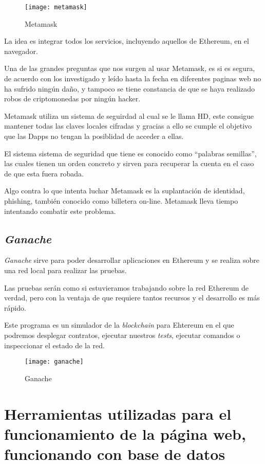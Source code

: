 \begin{figure}[h]
	\centering
  \texttt{[image: metamask]}
  \caption{Metamask}
\end{figure}

La idea es integrar todos los servicios, incluyendo aquellos de Ethereum, en el navegador.

Una de las grandes preguntas que nos surgen al usar Metamask, es si es segura, de acuerdo con los investigado y leído hasta la fecha en diferentes paginas web no ha sufrido ningún daño, y tampoco se tiene constancia de que se haya realizado robos de criptomonedas por ningún hacker.

Metamask utiliza un sistema de seguirdad al cual se le llama HD, este consigue mantener todas las claves locales cifradas y gracias a ello se cumple el objetivo que las Dapps no tengan la posiblidad de acceder a ellas.

El sistema sistema de seguridad que tiene es conocido como ``palabras semillas'', las cuales tienen un orden concreto y sirven para recuperar la cuenta en el caso de que esta fuera robada.
 
Algo contra lo que intenta luchar Metamask es la suplantación de identidad, phishing, también conocido como billetera on-line. Metamask lleva tiempo intentando combatir este problema. 
 
\subsection{\textit{Ganache}}

\textit{Ganache}\cite{ganache} sirve para poder desarrollar aplicaciones en Ethereum y se realiza sobre una red local para realizar las pruebas. 

Las pruebas serán como si estuvieramos trabajando sobre la red Ethereum de verdad, pero con la ventaja de que requiere tantos recursos y el desarrollo es más rápido. 

Este programa es un simulador de la \textit{blockchain} para Ehtereum en el que podremos desplegar contratos, ejecutar nuestros \textit{tests}, ejecutar comandos o inspeccionar el estado de la red.

\begin{figure}[h!]
  \centering
  \texttt{[image: ganache]}
  \caption{Ganache}
\end{figure}
\section{Herramientas utilizadas para el funcionamiento de la página web, funcionando con base de datos}

